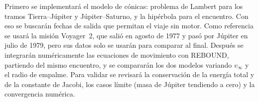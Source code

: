 \documentclass[12pt,letterpaper]{article}
\begin{document}
Primero se implementará el modelo de cónicas: problema de Lambert para los tramos
Tierra--Júpiter y Júpiter--Saturno, y la hipérbola para el encuentro. Con eso se buscarán
fechas de salida que permitan el viaje sin motor. Como referencia se usará la misión
Voyager~2, que salió en agosto de 1977 y pasó por Júpiter en julio de 1979, pero sus datos
solo se usarán para comparar al final. Después se integrarán numéricamente las ecuaciones
de movimiento con REBOUND, partiendo del mismo encuentro, y se compararán los dos modelos
variando $v_\infty$ y el radio de empalme. Para validar se revisará la conservación de la
energía total y de la constante de Jacobi, los casos límite (masa de Júpiter tendiendo a
cero) y la convergencia numérica.
\end{document}
